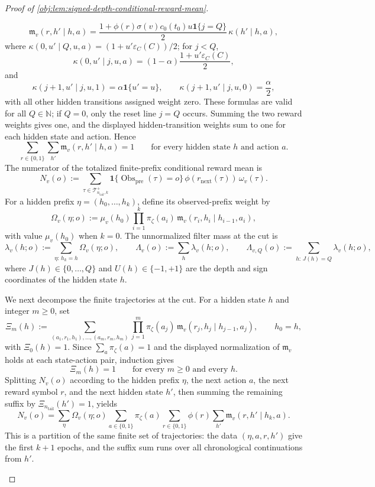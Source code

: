 \begin{proof}[Proof of \cref{obj:lem:signed-depth-conditional-reward-mean}]
\begin{enumerate}
\[
\mathfrak m_v(r,h'\mid h,a)
=
\frac{1+\phi(r)\sigma(v)c_0(t_0)u\mathbf 1\{j=Q\}}{2}
\,\kappa(h'\mid h,a),
\]
where \(\kappa(0,u'\mid Q,u,a)=(1+u'\varepsilon_C(C))/2\); for \(j<Q\),
\[
\kappa(0,u'\mid j,u,a)=(1-\alpha)\frac{1+u'\varepsilon_C(C)}{2},
\]
and
\[
\kappa(j+1,u'\mid j,u,1)=\alpha\mathbf 1\{u'=u\},
\qquad
\kappa(j+1,u'\mid j,u,0)=\frac{\alpha}{2},
\]
with all other hidden transitions assigned weight zero. These formulas are valid for all \(Q\in\mathbb N\); if \(Q=0\), only the reset line \(j=Q\) occurs. Summing the two reward weights gives one, and the displayed hidden-transition weights sum to one for each hidden state and action. Hence
\[
\sum_{r\in\{0,1\}}\sum_{h'}
\mathfrak m_v(r,h'\mid h,a)=1
\qquad
\text{for every hidden state }h\text{ and action }a.
\]
The numerator of the totalized finite-prefix conditional reward mean is
\[
N_v(o):=
\sum_{\tau\in\mathcal T^+_{n_{\mathrm{tail}},k}}
\mathbf 1\{\operatorname{Obs}_{\mathrm{pre}}(\tau)=o\}\,
\phi(r_{\mathrm{next}}(\tau))\,\omega_v(\tau).
\]
For a hidden prefix \(\eta=(h_0,\ldots,h_k)\), define its observed-prefix weight by
\[
\Omega_v(\eta;o)
:=
\mu_v(h_0)
\prod_{i=1}^{k}
\pi_\zeta(a_i)\,
\mathfrak m_v(r_i,h_i\mid h_{i-1},a_i),
\]
with value \(\mu_v(h_0)\) when \(k=0\). The unnormalized filter mass at the cut is
\[
\lambda_v(h;o)
:=
\sum_{\eta:\,h_k=h}\Omega_v(\eta;o),
\qquad
\Lambda_v(o):=\sum_h \lambda_v(h;o),
\qquad
\Lambda_{v,Q}(o):=\sum_{h:\,J(h)=Q}\lambda_v(h;o),
\]
where \(J(h)\in\{0,\ldots,Q\}\) and \(U(h)\in\{-1,+1\}\) are the depth and sign coordinates of the hidden state \(h\).

We next decompose the finite trajectories at the cut. For a hidden state \(h\) and integer \(m\ge0\), set
\[
\Xi_m(h)
:=
\sum_{(a_1,r_1,h_1),\ldots,(a_m,r_m,h_m)}
\prod_{j=1}^{m}
\pi_\zeta(a_j)\,
\mathfrak m_v(r_j,h_j\mid h_{j-1},a_j),
\qquad h_0=h,
\]
with \(\Xi_0(h)=1\). Since \(\sum_a\pi_\zeta(a)=1\) and the displayed normalization of \(\mathfrak m_v\) holds at each state-action pair, induction gives
\[
\Xi_m(h)=1
\qquad
\text{for every }m\ge0\text{ and every }h.
\]
Splitting \(N_v(o)\) according to the hidden prefix \(\eta\), the next action \(a\), the next reward symbol \(r\), and the next hidden state \(h'\), then summing the remaining suffix by \(\Xi_{n_{\mathrm{tail}}}(h')=1\), yields
\[
N_v(o)
=
\sum_{\eta}\Omega_v(\eta;o)
\sum_{a\in\{0,1\}}\pi_\zeta(a)
\sum_{r\in\{0,1\}}\phi(r)
\sum_{h'}\mathfrak m_v(r,h'\mid h_k,a).
\]
This is a partition of the same finite set of trajectories: the data \((\eta,a,r,h')\) give the first \(k+1\) epochs, and the suffix sum runs over all chronological continuations from \(h'\).


\end{enumerate}
\end{proof}
